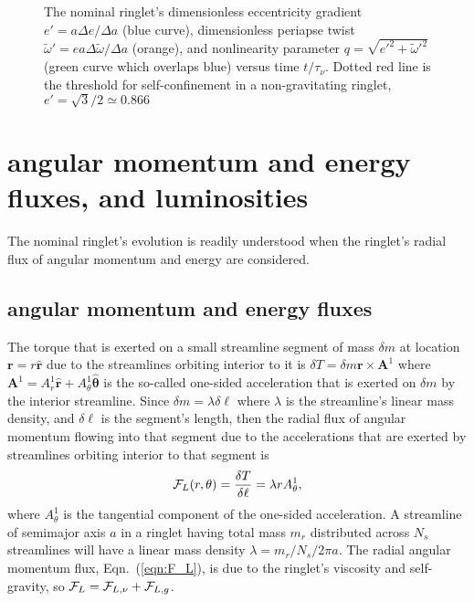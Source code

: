 \documentclass[preprint]{aastex62}
\begin{document}
\begin{figure}
    \caption{
        \label{fig:de_prime_nominal}
        The nominal ringlet's dimensionless eccentricity gradient $e' = a\Delta e/\Delta a$
        (blue curve), dimensionless periapse twist $\tilde{\omega}' = ea\Delta\tilde{\omega}/\Delta a$
        (orange), and nonlinearity parameter $q=\sqrt{e'^2 + \tilde{\omega}'^2}$
        (green curve which overlaps blue) versus time $t/\tau_\nu$. Dotted red line 
        is the threshold for self-confinement in a non-gravitating ringlet, $e'=\sqrt{3}/2\simeq0.866$
    }
\end{figure}\vfil


\section{angular momentum and energy fluxes, and luminosities}
\label{sec:fluxes}

The nominal ringlet's evolution is readily understood when the ringlet's 
radial flux of angular momentum and energy are considered. 

\subsection{angular momentum and energy fluxes}
\label{subsec:fluxes}

The torque that is exerted on a small streamline segment of mass $\delta m$
at location $\mathbf{r}=r\hat{\mathbf{r}}$
due to the streamlines orbiting interior to it is $\delta T=\delta m\mathbf{r}\times\mathbf{A}^1$ where 
$\mathbf{A}^1=A^1_r\hat{\mathbf{r}} + A^1_\theta\hat{\boldsymbol\theta}$
is the so-called one-sided acceleration that is exerted on $\delta m$ by the interior streamline. 
Since $\delta m=\lambda\delta\ell$ where $\lambda$ is the streamline's linear mass density,
and $\delta\ell$ is the segment's length, then the radial flux of angular momentum flowing into
that segment due to the accelerations that are exerted by streamlines orbiting interior to that
segment is
\begin{equation}
    \label{eqn:F_L}
    {\cal F}_L(r, \theta) = \frac{\delta T}{\delta\ell} = \lambda r A^1_\theta,
\end{equation}
where $A^1_\theta$ is the tangential component of the one-sided acceleration.
A streamline of semimajor axis $a$ in a ringlet having total mass $m_r$ 
distributed across $N_s$ streamlines will have a linear mass density $\lambda=m_r/N_s/2\pi a$.
The radial angular momentum flux, Eqn.\ (\ref{eqn:F_L}), is due to the ringlet's viscosity and self-gravity,
so ${\cal F}_L = {\cal F}_{L,\nu} + {\cal F}_{L,g}$. 
\end{document}
